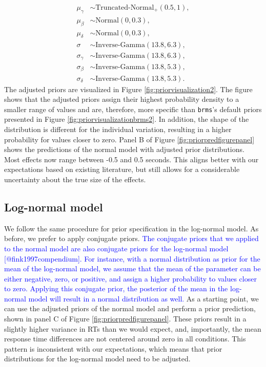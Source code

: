 \documentclass[
  english,
  doc,floatsintext]{apa6}
\begin{document}
\begin{equation}
\begin{aligned}
\mu_{\gamma} &\sim \text{Truncated-Normal}_{+}(0.5, 1), \label{eq:chosenpriors2sd} \\
\mu_{\beta} &\sim \text{Normal}(0, 0.3), \\ 
\mu_{\delta} &\sim \text{Normal}(0, 0.3), \\  
\sigma &\sim \text{Inverse-Gamma}(13.8, 6.3),  \\ 
\sigma_{\gamma} &\sim \text{Inverse-Gamma}(13.8, 6.3), \\   
\sigma_{\beta} &\sim \text{Inverse-Gamma}(13.8, 5.3), \\    
\sigma_{\delta} &\sim \text{Inverse-Gamma}(13.8, 5.3).     
\end{aligned}
\end{equation}
The adjusted priors are visualized in Figure \ref{fig:priorvisualization2}. The figure shows that the adjusted priors assign their highest probability density to a smaller range of values and are, therefore, more specific than \texttt{brms}'s default priors presented in Figure \ref{fig:priorvisualizationbrms2}. In addition, the shape of the distribution is different for the individual variation, resulting in a higher probability for values closer to zero. Panel B of Figure \ref{fig:priorpredfigurepanel} shows the predictions of the normal model with adjusted prior distributions. Most effects now range between -0.5 and 0.5 seconds. This aligns better with our expectations based on existing literature, but still allows for a considerable uncertainty about the true size of the effects.

\hypertarget{log-normal-model-1}{%
\subsection{Log-normal model}\label{log-normal-model-1}}

We follow the same procedure for prior specification in the log-normal model. As before, we prefer to apply conjugate priors. \textcolor{blue}{The conjugate priors that we applied to the normal model are also conjugate priors for the log-normal model [@fink1997compendium]. For instance, with a normal distribution as prior for the mean of the log-normal model, we assume that the mean of the parameter can be either negative, zero, or positive, and assign a higher probability to values closer to zero. Applying this conjugate prior, the posterior of the mean in the log-normal model will result in a normal distribution as well.}
As a starting point, we can use the adjusted priors of the normal model and perform a prior prediction, shown in panel C of Figure \ref{fig:priorpredfigurepanel}. These priors result in a slightly higher variance in RTs than we would expect, and, importantly, the mean response time differences are not centered around zero in all conditions. This pattern is inconsistent with our expectations, which means that prior distributions for the log-normal model need to be adjusted.
\end{document}
